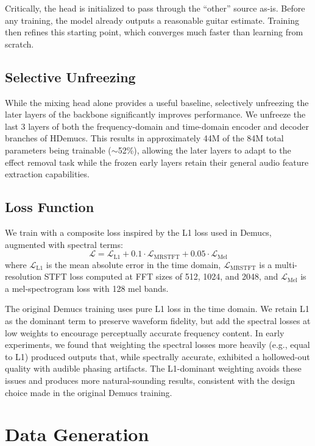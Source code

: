 \documentclass[11pt,twocolumn]{article}
\begin{document}
Critically, the head is initialized to pass through the ``other'' source as-is. Before any training, the model already outputs a reasonable guitar estimate. Training then refines this starting point, which converges much faster than learning from scratch.

\subsection{Selective Unfreezing}

While the mixing head alone provides a useful baseline, selectively unfreezing the later layers of the backbone significantly improves performance. We unfreeze the last 3 layers of both the frequency-domain and time-domain encoder and decoder branches of HDemucs. This results in approximately 44M of the 84M total parameters being trainable ($\sim$52\%), allowing the later layers to adapt to the effect removal task while the frozen early layers retain their general audio feature extraction capabilities.

\subsection{Loss Function}

We train with a composite loss inspired by the L1 loss used in Demucs, augmented with spectral terms:
\begin{equation}
\mathcal{L} = \mathcal{L}_{\text{L1}} + 0.1 \cdot \mathcal{L}_{\text{MRSTFT}} + 0.05 \cdot \mathcal{L}_{\text{Mel}}
\end{equation}
where $\mathcal{L}_{\text{L1}}$ is the mean absolute error in the time domain, $\mathcal{L}_{\text{MRSTFT}}$ is a multi-resolution STFT loss computed at FFT sizes of 512, 1024, and 2048, and $\mathcal{L}_{\text{Mel}}$ is a mel-spectrogram loss with 128 mel bands.

The original Demucs training uses pure L1 loss in the time domain. We retain L1 as the dominant term to preserve waveform fidelity, but add the spectral losses at low weights to encourage perceptually accurate frequency content. In early experiments, we found that weighting the spectral losses more heavily (e.g., equal to L1) produced outputs that, while spectrally accurate, exhibited a hollowed-out quality with audible phasing artifacts. The L1-dominant weighting avoids these issues and produces more natural-sounding results, consistent with the design choice made in the original Demucs training.

\section{Data Generation}
\end{document}
